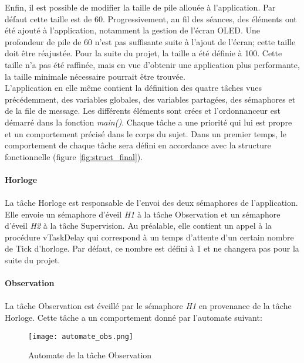 \indent Enfin, il est possible de modifier la taille de pile allouée à l'application.
Par défaut cette taille est de 60.
Progressivement, au fil des séances, des éléments ont été ajouté à l'application, notamment la gestion de l'écran OLED.
Une profondeur de pile de 60 n'est pas suffisante suite à l'ajout de l'écran; cette taille doit être réajustée.
Pour la suite du projet, la taille a été définie à 100.
Cette taille n'a pas été raffinée, mais en vue d'obtenir une application plus performante, la taille minimale nécessaire pourrait être trouvée.\\
\indent L'application en elle même contient la définition des quatre tâches vues précédemment, des variables globales, des variables partagées, des sémaphores et de la file de message.
Les différents éléments sont crées et l'ordonnanceur est démarré dans la fonction \textit{main()}.
Chaque tâche a une priorité qui lui est propre et un comportement précisé dans le corps du sujet.
Dans un premier temps, le comportement de chaque tâche sera défini en accordance avec la structure fonctionnelle (figure \ref{fig:struct_final}).
\\\\
\textbf{Horloge}
\\\\
La tâche Horloge est responsable de l'envoi des deux sémaphores de l'application. 
Elle envoie un sémaphore d'éveil \textit{H1} à la tâche Observation et un sémaphore d'éveil \textit{H2} à la tâche Supervision.
Au préalable, elle contient un appel à la procédure vTaskDelay qui correspond à un temps d'attente d'un certain nombre de Tick d'horloge.
Par défaut, ce nombre est défini à 1 et ne changera pas pour la suite du projet.
\\\\
\textbf{Observation}
\\\\
La tâche Observation est éveillé par le sémaphore \textit{H1} en provenance de la tâche Horloge.
Cette tâche a un comportement donné par l'automate suivant:

\begin{figure}[h]
    \centering
    \texttt{[image: automate\_obs.png]}
    \caption{Automate de la tâche Observation}
    \label{fig:automate}
\end{figure}

